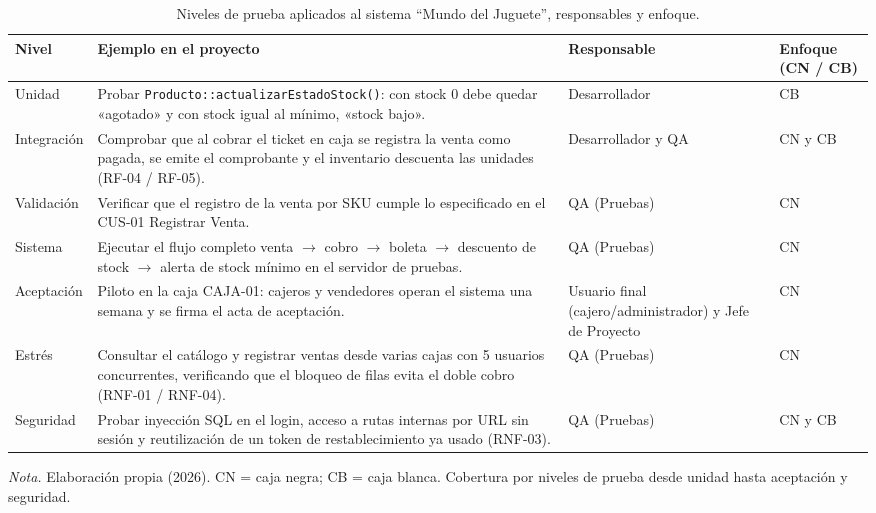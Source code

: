 \begin{table}[H]
  \centering
  \small
  \caption{Niveles de prueba aplicados al sistema ``Mundo del Juguete'', responsables y enfoque.}
  \label{tab:pruebas_niveles}
  \begin{tabularx}{\linewidth}{|L{2.2cm}|Y|L{3.2cm}|C{1.8cm}|}
    \hline
    \textbf{Nivel} & \textbf{Ejemplo en el proyecto} & \textbf{Responsable} & \textbf{Enfoque (CN / CB)} \\ \hline
    Unidad & Probar \texttt{Producto::\allowbreak actualizarEstadoStock()}: con stock 0 debe quedar «agotado» y con stock igual al mínimo, «stock bajo». & Desarrollador & CB \\ \hline
    Integración & Comprobar que al cobrar el ticket en caja se registra la venta como pagada, se emite el comprobante y el inventario descuenta las unidades (RF-04 / RF-05). & Desarrollador y QA & CN y CB \\ \hline
    Validación & Verificar que el registro de la venta por SKU cumple lo especificado en el CUS-01 Registrar Venta. & QA (Pruebas) & CN \\ \hline
    Sistema & Ejecutar el flujo completo venta $\rightarrow$ cobro $\rightarrow$ boleta $\rightarrow$ descuento de stock $\rightarrow$ alerta de stock mínimo en el servidor de pruebas. & QA (Pruebas) & CN \\ \hline
    Aceptación & Piloto en la caja CAJA-01: cajeros y vendedores operan el sistema una semana y se firma el acta de aceptación. & Usuario final (cajero/administrador) y Jefe de Proyecto & CN \\ \hline
    Estrés & Consultar el catálogo y registrar ventas desde varias cajas con 5 usuarios concurrentes, verificando que el bloqueo de filas evita el doble cobro (RNF-01 / RNF-04). & QA (Pruebas) & CN \\ \hline
    Seguridad & Probar inyección SQL en el login, acceso a rutas internas por URL sin sesión y reutilización de un token de restablecimiento ya usado (RNF-03). & QA (Pruebas) & CN y CB \\ \hline
  \end{tabularx}
  \par\vspace{0.2cm}
  {\raggedright \small \emph{Nota.} Elaboración propia (2026). CN = caja negra; CB = caja blanca. Cobertura por niveles de prueba desde unidad hasta aceptación y seguridad.\par}
\end{table}
